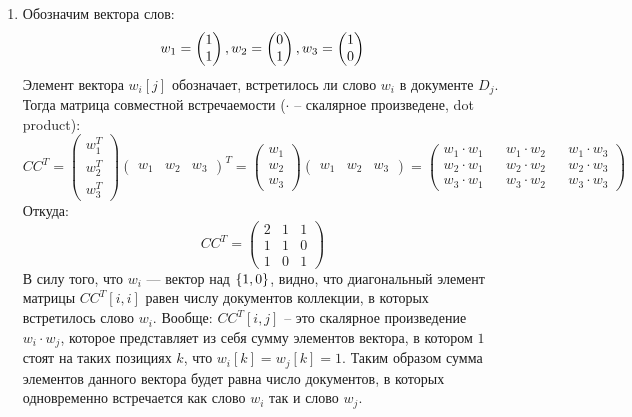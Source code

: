 \begin{solution}
\begin{enumerate}
	\item Обозначим вектора слов:
	\begin{equation*}
		w_1 = \begin{pmatrix}1\\1\end{pmatrix},
		w_2 = \begin{pmatrix}0\\1\end{pmatrix},
		w_3 = \begin{pmatrix}1\\0\end{pmatrix}
	\end{equation*}
	Элемент вектора $w_i[j]$ обозначает, встретилось ли слово $w_i$ в документе $D_j$.\\
	Тогда матрица совместной встречаемости ($\cdot$ -- скалярное произведене, dot product):
	\begin{equation*}
		CC^T = 
		\begin{pmatrix}
		w_1^T \\
		w_2^T \\
		w_3^T
		\end{pmatrix}
		\begin{pmatrix}
		w_1 & w_2 & w_3
		\end{pmatrix}^T
		=
		\begin{pmatrix}
		w_1 \\ w_2 \\ w_3
		\end{pmatrix}
		\begin{pmatrix}
		w_1 & w_2 & w_3
		\end{pmatrix}
		=
		\begin{pmatrix}
		w_1 \cdot w_1 && w_1 \cdot w_2 && w_1 \cdot w_3 \\
		w_2 \cdot w_1 && w_2 \cdot w_2 && w_2 \cdot w_3 \\
		w_3 \cdot w_1 && w_3 \cdot w_2 && w_3 \cdot w_3
		\end{pmatrix}
	\end{equation*}
	Откуда:
	\begin{equation*}
	CC^T=
	\begin{pmatrix}
	2 & 1 & 1 \\
	1 & 1 & 0 \\
	1 & 0 & 1 
	\end{pmatrix}
	\end{equation*}
	В силу того, что $w_i$ --- вектор над $\left\lbrace 1, 0 \right\rbrace$, видно, что диагональный элемент матрицы $CC^T[i, i]$ равен числу документов коллекции, в которых встретилось слово $w_i$. Вообще: $CC^T[i, j]$ -- это скалярное произведение $w_i \cdot w_j$, которое
	представляет из себя сумму элементов вектора, в котором $1$ стоят на таких позициях $k$, что $w_i[k] = w_j[k] = 1$. Таким образом сумма элементов данного вектора будет равна число документов, в которых одновременно встречается как слово $w_i$ так и слово $w_j$.

\end{enumerate}
\end{solution}
